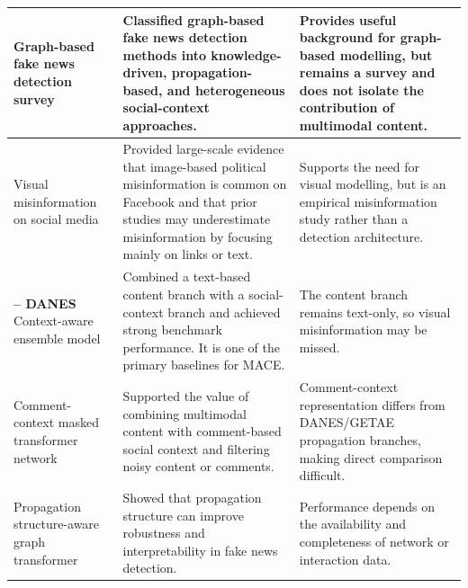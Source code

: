 {\begin{longtable}{
>{\raggedright\arraybackslash}p{}
>{\raggedright\arraybackslash}p{}
>{\raggedright\arraybackslash}p{}
}
\midrule

\textbf{\citet{gong2023fakenewsdetectiongraphbased}} \newline
Graph-based fake news detection survey
&
Classified graph-based fake news detection methods into knowledge-driven, propagation-based, and heterogeneous social-context approaches.
&
Provides useful background for graph-based modelling, but remains a survey and does not isolate the contribution of multimodal content. \\

\midrule

\textbf{\citet{yang2023facebook}} \newline
Visual misinformation on social media
&
Provided large-scale evidence that image-based political misinformation is common on Facebook and that prior studies may underestimate misinformation by focusing mainly on links or text.
&
Supports the need for visual modelling, but is an empirical misinformation study rather than a detection architecture. \\

\midrule

\textbf{\citet{truica2024danes} -- DANES} \newline
Context-aware ensemble model
&
Combined a text-based content branch with a social-context branch and achieved strong benchmark performance. It is one of the primary baselines for MACE.
&
The content branch remains text-only, so visual misinformation may be missed. \\

\midrule

\textbf{\citet{Wang2024}} \newline
Comment-context masked transformer network
&
Supported the value of combining multimodal content with comment-based social context and filtering noisy content or comments.
&
Comment-context representation differs from DANES/GETAE propagation branches, making direct comparison difficult. \\

\midrule

\textbf{\citet{Zhu24}} \newline
Propagation structure-aware graph transformer
&
Showed that propagation structure can improve robustness and interpretability in fake news detection.
&
Performance depends on the availability and completeness of network or interaction data. \\

\midrule


\end{longtable}}
